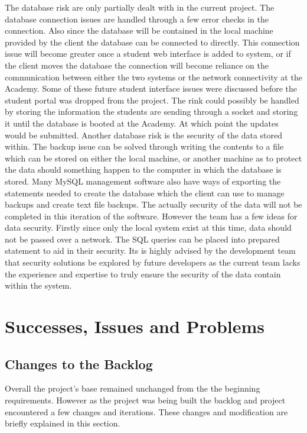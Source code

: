 The database risk are only partially dealt with in the current project. The database connection issues are handled through a few error checks in the connection. Also since the database will be contained in the local machine provided by the client the database can be connected to directly. This connection issue will become greater once a student web interface is added to system, or if the client moves the database the connection will become reliance on the communication between either the two systems or the network connectivity at the Academy. Some of these future student interface issues were discussed before the student portal was dropped from the project. The rink could possibly be handled by storing the information the students are sending through a socket and storing it until the database is booted at the Academy. At which point the updates would be submitted.
Another database risk is the security of the data stored within. The backup issue can be solved through writing the contents to a file which can be stored on either the local machine, or another machine as to protect the data should something happen to the computer in which the database is stored. Many MySQL management software also have ways of exporting the statements needed to create the database which the client can use to manage backups and create text file backups. The actually security of the data will not be completed in this iteration of the software. However the team has a few ideas for data security. Firstly since only the local system exist at this time, data should not be passed over a network. The SQL queries can be placed into prepared statement to aid in their security. Its is highly advised by the development team that security solutions be explored by future developers as the current team lacks the experience and expertise to truly ensure the security of the data contain within the system.

\section{Successes, Issues and Problems}

\subsection{Changes to the Backlog}
Overall the project's base remained unchanged from the the beginning requirements. However as the project was being built the backlog and project encountered a few changes and iterations. These changes and modification are briefly explained in this section. 

